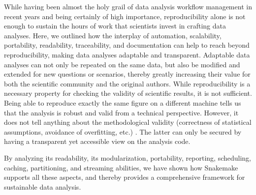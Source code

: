 \documentclass[parskip=half]{scrartcl}
\begin{document}
While having been almost the holy grail of data analysis workflow management in recent years and being certainly of high importance, reproducibility alone is not enough to sustain the hours of work that scientists invest in crafting data analyses.
Here, we outlined how the interplay of automation, scalability, portability, readability, traceability, and documentation can help to reach beyond reproducibility, making data analyses adaptable and transparent.
Adaptable data analyses can not only be repeated on the same data, but also be modified and extended for new questions or scenarios, thereby greatly increasing their value for both the scientific community and the original authors.
While reproducibility is a necessary property for checking the validity of scientific results, it is not sufficient.
Being able to reproduce exactly the same figure on a different machine tells us that the analysis is robust and valid from a technical perspective.
However, it does not tell anything about the methodological validity (correctness of statistical assumptions, avoidance of overfitting, etc.)
.
The latter can only be secured by having a transparent yet accessible view on the analysis code.

By analyzing its readability, its modularization, portability, reporting, scheduling, caching, partitioning, and streaming abilities, we have shown how Snakemake supports all these aspects, and thereby provides a comprehensive framework for sustainable data analysis.

\printbibliography
\end{document}

